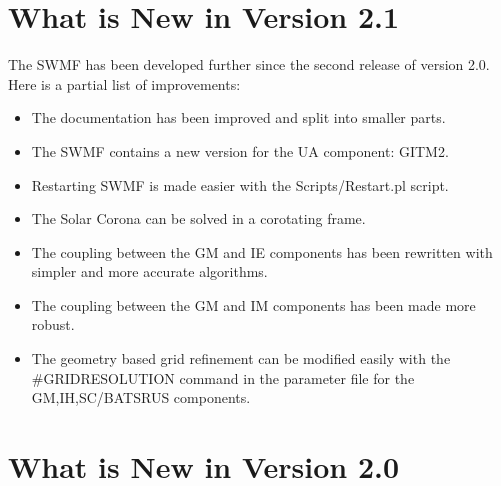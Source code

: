 \section{What is New in Version 2.1}

The SWMF has been developed further since the second release of
version 2.0. Here is a partial list of improvements:
\begin{itemize}
\item The documentation has been improved and split into smaller parts.
\item The SWMF contains a new version for the UA component: GITM2.
\item Restarting SWMF is made easier with the Scripts/Restart.pl script.
\item The Solar Corona can be solved in a corotating frame.
\item The coupling between the GM and IE components has been rewritten
      with simpler and more accurate algorithms.
\item The coupling between the GM and IM components has been made more robust.
\item The geometry based grid refinement can be modified easily with
      the \#GRIDRESOLUTION command in the
      parameter file for the GM,IH,SC/BATSRUS components.

\end{itemize}

\section{What is New in Version 2.0}

